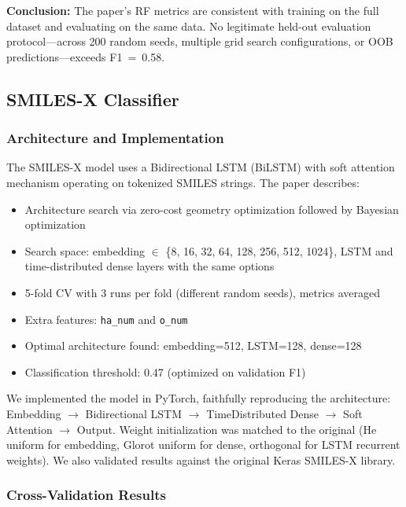\documentclass[11pt,a4paper]{article}
\begin{document}
\textbf{Conclusion:} The paper's RF metrics are consistent with training on the full dataset and evaluating on the same data. No legitimate held-out evaluation protocol---across 200 random seeds, multiple grid search configurations, or OOB predictions---exceeds F1~=~0.58.

\subsection{SMILES-X Classifier}
\label{sec:smilesx}

\subsubsection{Architecture and Implementation}

The SMILES-X model uses a Bidirectional LSTM (BiLSTM) with soft attention mechanism operating on tokenized SMILES strings. The paper describes:
\begin{itemize}[nosep]
    \item Architecture search via zero-cost geometry optimization followed by Bayesian optimization
    \item Search space: embedding $\in$ \{8, 16, 32, 64, 128, 256, 512, 1024\}, LSTM and time-distributed dense layers with the same options
    \item 5-fold CV with 3 runs per fold (different random seeds), metrics averaged
    \item Extra features: \texttt{ha\_num} and \texttt{o\_num}
    \item Optimal architecture found: embedding=512, LSTM=128, dense=128
    \item Classification threshold: 0.47 (optimized on validation F1)
\end{itemize}

We implemented the model in PyTorch, faithfully reproducing the architecture: Embedding $\to$ Bidirectional LSTM $\to$ TimeDistributed Dense $\to$ Soft Attention $\to$ Output. Weight initialization was matched to the original (He uniform for embedding, Glorot uniform for dense, orthogonal for LSTM recurrent weights). We also validated results against the original Keras SMILES-X library.

\subsubsection{Cross-Validation Results}
\end{document}
